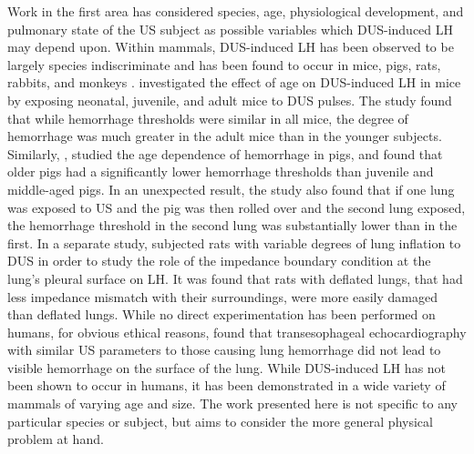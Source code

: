 Work in the first area has considered species, age, physiological
development, and pulmonary state of the \ac{US} subject as possible
variables which \ac{DUS}-induced \ac{LH} may depend upon.  Within
mammals, \ac{DUS}-induced \ac{LH} has been observed to be largely
species indiscriminate and has been found to occur in mice, pigs,
rats, rabbits, and monkeys \citep{Baggs1996, Child1990, Dalecki1997,
  Frizzell1994, Frizzell2003, Harrison1995, Holland1996, Kramer2001,
  OBrien1997a, OBrien2001b, OBrien2003a, OBrien2005, OBrien2000,
  OBrien2001a, Penney1993a, Raeman1993, Raeman1996, Tarantal1994a,
  Zachary1995a, Zachary2001, Zachary2001a}. \cite{Dalecki1997}
investigated the effect of age on \ac{DUS}-induced \ac{LH} in mice by
exposing neonatal, juvenile, and adult mice to \ac{DUS} pulses. The
study found that while hemorrhage thresholds were similar in all mice,
the degree of hemorrhage was much greater in the adult mice than in
the younger subjects. Similarly, \cite{OBrien2003a}, studied the age
dependence of hemorrhage in pigs, and found that older pigs had a
significantly lower hemorrhage thresholds than juvenile and
middle-aged pigs. In an unexpected result, the study also found that
if one lung was exposed to \ac{US} and the pig was then rolled over
and the second lung exposed, the hemorrhage threshold in the second
lung was substantially lower than in the first. In a separate study,
\cite{OBrien2002a} subjected rats with variable degrees of lung
inflation to \ac{DUS} in order to study the role of the impedance
boundary condition at the lung’s pleural surface on \ac{LH}. It was
found that rats with deflated lungs, that had less impedance mismatch
with their surroundings, were more easily damaged than deflated
lungs. While no direct experimentation has been performed on humans,
for obvious ethical reasons, \cite{Meltzer1998} found that
transesophageal echocardiography with similar \ac{US} parameters to
those causing lung hemorrhage did not lead to visible hemorrhage on
the surface of the lung. While \ac{DUS}-induced \ac{LH} has not been
shown to occur in humans, it has been demonstrated in a wide variety
of mammals of varying age and size. The work presented here is not
specific to any particular species or subject, but aims to consider
the more general physical problem at hand.


